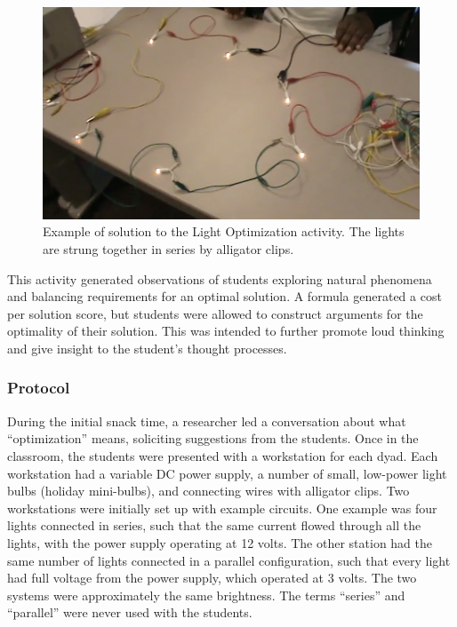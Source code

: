 	\begin{figure}
	\begin{centering}
	\includegraphics[width=\textwidth]{images/lights-desk}
	\par\end{centering}
	\caption[Example of a solution to the Light Optimization activity.]{Example of solution to the Light Optimization activity. The lights are strung together in series by alligator clips.}
	\label{fig:lightsdesk}
	\end{figure}
	
	This activity generated observations of students exploring natural phenomena and balancing requirements for an optimal solution. A formula generated a cost per solution score, but students were allowed to construct arguments for the optimality of their solution. This
	was intended to further promote loud thinking and give insight to the student's thought processes.
	
	\subsubsection{Protocol}
	
	During the initial snack time, a researcher led a conversation about what ``optimization'' means, soliciting suggestions from the students. Once in the classroom, the students were presented with a workstation for each dyad. Each workstation had a variable DC power supply, a number of small, low-power light bulbs (holiday mini-bulbs), and connecting wires with alligator clips. Two workstations were initially set up with example circuits. One example was four lights connected in series, such that the same current flowed through all the lights, with the power supply operating at 12 volts. The other station had the same number of lights connected in a parallel configuration, such that every light had full voltage from the power supply, which operated at 3 volts. The two systems were approximately the same brightness. The terms {}``series'' and {}``parallel'' were never used with the students.
	
